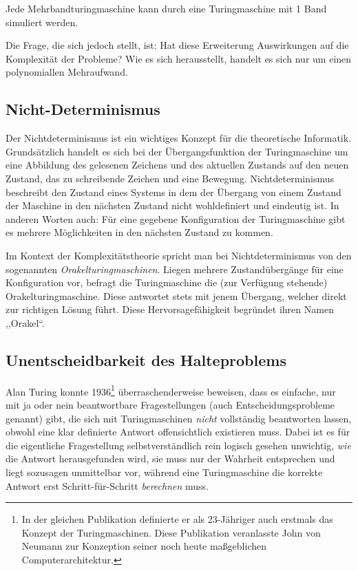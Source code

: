 Jede Mehrbandturingmaschine kann durch eine Turingmaschine mit 1 Band simuliert werden.

Die Frage, die sich jedoch stellt, ist: Hat diese Erweiterung Auswirkungen auf die Komplexität der Probleme? Wie es sich herausstellt, handelt es sich nur um einen polynomiallen Mehraufwand.
%
\subsection{Nicht-Determinismus}
\label{sec:nondeterminism}
%
Der Nichtdeterminismus ist ein wichtiges Konzept für die theoretische Informatik. Grundsätzlich handelt es sich bei der Übergangsfunktion der Turingmaschine um eine Abbildung des gelesenen Zeichens und des aktuellen Zustands auf den neuen Zustand, das zu schreibende Zeichen und eine Bewegung. Nichtdeterminismus beschreibt den Zustand eines Systems in dem der Übergang von einem Zustand der Maschine in den nächsten Zustand nicht wohldefiniert und eindeutig ist. In anderen Worten auch: Für eine gegebene Konfiguration der Turingmaschine gibt es mehrere Möglichkeiten in den nächsten Zustand zu kommen.

Im Kontext der Komplexitätstheorie spricht man bei Nichtdeterminismus von den sogenannten \emph{Orakelturingmaschinen}. Liegen mehrere Zustandübergänge für eine Konfiguration vor, befragt die Turingmaschine die (zur Verfügung stehende) Orakelturingmaschine. Diese antwortet stets mit jenem Übergang, welcher direkt zur richtigen Lösung führt. Diese Hervorsagefähigkeit begründet ihren Namen ,,Orakel``.
%
\subsection{Unentscheidbarkeit des Halteproblems}
%
Alan Turing konnte 1936\footnote{In der gleichen Publikation definierte er als 23-Jähriger auch erstmals das Konzept der Turingmaschinen. Diese Publikation veranlasste John von Neumann zur Konzeption seiner noch heute maßgeblichen Computerarchitektur.} überraschenderweise beweisen, dass es einfache, nur mit ja oder nein beantwortbare Fragestellungen (auch Entscheidungsprobleme genannt) gibt, die sich mit Turingmaschinen \emph{nicht} vollständig beantworten lassen, obwohl eine klar definierte Antwort offensichtlich existieren muss. Dabei ist es für die eigentliche Fragestellung selbstverständlich rein logisch gesehen unwichtig, \emph{wie} die Antwort herausgefunden wird, sie muss nur der Wahrheit entsprechen und liegt sozusagen unmittelbar vor, während eine Turingmaschine die korrekte Antwort erst Schritt-für-Schritt \emph{berechnen} muss. 

